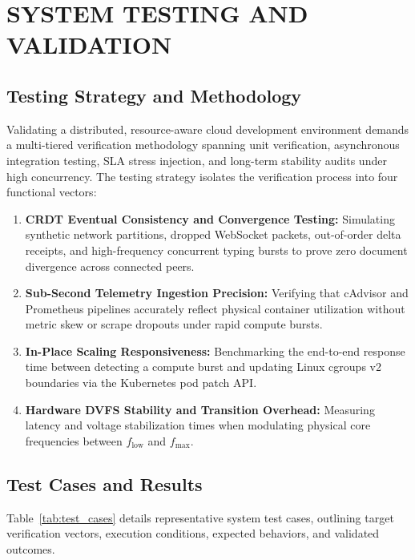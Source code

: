 \documentclass[12pt,a4paper]{report}
\begin{document}
\chapter{SYSTEM TESTING AND VALIDATION}

\section{Testing Strategy and Methodology}
Validating a distributed, resource-aware cloud development environment demands a multi-tiered verification methodology spanning unit verification, asynchronous integration testing, SLA stress injection, and long-term stability audits under high concurrency. The testing strategy isolates the verification process into four functional vectors:
\begin{enumerate}
    \item \textbf{CRDT Eventual Consistency and Convergence Testing:} Simulating synthetic network partitions, dropped WebSocket packets, out-of-order delta receipts, and high-frequency concurrent typing bursts to prove zero document divergence across connected peers.
    \item \textbf{Sub-Second Telemetry Ingestion Precision:} Verifying that cAdvisor and Prometheus pipelines accurately reflect physical container utilization without metric skew or scrape dropouts under rapid compute bursts.
    \item \textbf{In-Place Scaling Responsiveness:} Benchmarking the end-to-end response time between detecting a compute burst and updating Linux cgroups v2 boundaries via the Kubernetes pod patch API.
    \item \textbf{Hardware DVFS Stability and Transition Overhead:} Measuring latency and voltage stabilization times when modulating physical core frequencies between $f_{\text{low}}$ and $f_{\max}$.
\end{enumerate}

\section{Test Cases and Results}
Table~\ref{tab:test_cases} details representative system test cases, outlining target verification vectors, execution conditions, expected behaviors, and validated outcomes.
\end{document}
